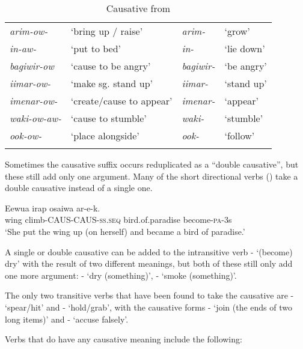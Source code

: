 \begin{table}
\caption{Causative from} 
\begin{tabular}{>{\itshape}ll>{\itshape}ll}
\mytoprule
arim-ow- &`bring up / raise' &arim- &`grow'\\
in-aw- &`put to bed' &in- &`lie down'\\
bagiwir-ow &`cause to be angry' &bagiwir- &`be angry'\\
iimar-ow- &`make sg. stand up' &iimar- &`stand up'\\
imenar-ow- &`create/cause to appear' &imenar- &`appear'\\
waki-ow-aw- &`cause to stumble' &waki- &`stumble'\\
ook-ow- &`place alongside' &ook- &`follow'\\
\mybottomrule
\end{tabular}
\end{table}

Sometimes the causative suffix occurs reduplicated as a ``double causative'', but these still add only one argument. Many of the short directional verbs () take a double causative instead of a single one. 

\ea%
\label{ex:3:x205}
\gll Eewua irap osaiwa ar-e-k. \\
wing climb-CAUS-CAUS-\textsc{ss}.\textsc{seq} bird.of.paradise become-\textsc{pa}-3s \\
\glt`She put the wing up (on herself) and became a bird of paradise.'
\z

A single or double causative can be added to the intransitive verb - `(become) dry' with the result of two different meanings, but both of these still only add one more argument: - `dry (something)', - `smoke (something)'.

The only two transitive verbs that have been found to take the causative are - `spear/hit' and - `hold/grab', with the causative forms - `join (the ends of two long items)' and - `accuse falsely'. 

Verbs that do  have any causative meaning include the following:

